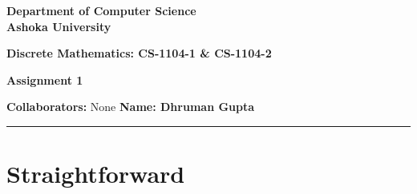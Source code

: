 \documentclass[a4paper]{article}
\begin{document}
\begin{center}
{\large \bf \color{red}  Department of Computer Science} \\
{\large \bf \color{red}  Ashoka University} \\

\vspace{0.1in}

{\large \bf \color{blue}  Discrete Mathematics: CS-1104-1 \& CS-1104-2}

\vspace{0.05in}

    { \bf \color{YellowOrange} Assignment 1}
\end{center}
\medskip

{\textbf{Collaborators:} None} \hfill {\textbf{Name: Dhruman Gupta} }

\bigskip
\hrule




\section{Straightforward}
\end{document}
